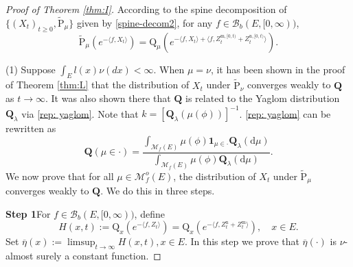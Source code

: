 \documentclass[12pt,a4paper]{amsart}
\numberwithin{equation}{section}
\theoremstyle{plain}
\theoremstyle{definition}
\theoremstyle{remark}
\begin{document}
\begin{proof}[Proof of Theorem \ref{thm:I}]
According to the spine decomposition of $\{(X_t)_{t\geq 0}, \widetilde{\mathrm P}_\mu\}$  given by
\eqref{spine-decom2}, for any
$f\in\mathcal B_b(E,[0,\infty))$,
\[
\widetilde {\mathrm P}_{\mu}\left(e^{-\langle f, X_t\rangle }\right)=\mathrm Q_{\mu}\left(e^{-\langle f, X_t\rangle+\langle f, Z^{{\mathrm m},[0,t)}_t+Z^{{\mathrm n},[0,t)}_t\rangle }\right).
\]

(1) Suppose $\int_El(x)\nu(dx)<\infty$.
When $\mu=\nu$, 
it has been shown in the proof of Theorem \ref{thm:L} that the distribution of
$X_t$ under $\widetilde {\mathrm P}_{\nu}$ converges weakly to $\mathbf Q$ as $t\to\infty$.
It was also shown there that $\mathbf Q$ is related to the Yaglom distribution $\mathbf Q_\lambda$ via \eqref{rep: yaglom}.
Note that $k=[\mathbf Q_\lambda(\mu(\phi))]^{-1}$. 
\eqref{rep: yaglom} can be rewritten as
\begin{equation}\label{eq size bias}
{\mathbf Q}\left(\mu\in\cdot\right)=
\dfrac{\int_{\mathcal M_f(E)}\mu(\phi)\mathbf 1_{\mu\in \cdot} \mathbf Q_\lambda(\mathrm d\mu)}{\int_{\mathcal M_f(E)}\mu(\phi)\mathbf Q_\lambda(\mathrm d\mu)}.
\end{equation}
We now prove that for all $\mu\in\mathcal M^o_f(E)$, the distribution of $X_t$ under $\widetilde {\mathrm P}_{\mu}$ converges weakly to $\mathbf Q$.  We do this in three steps.

{\bf Step 1}\quad For $f\in\mathcal B_b(E,[0,\infty))$, define
\begin{equation}\label{def: H}
H(x,t):={\mathrm Q}_x\left(e^{-\langle f, Z_{t}\rangle }\right)={\mathrm Q}_x\left(e^{-\langle f, Z^{\mathrm n}_{t} + Z^{\mathrm m}_{t}\rangle }\right),\quad x\in E.
\end{equation}
Set $\overline \eta(x):=\limsup_{t\to\infty}H(x,t), x\in E$.
In this step we prove that 
$\overline\eta(\cdot)$ is $\nu$-almost surely a constant function.


\end{proof}
\end{document}
